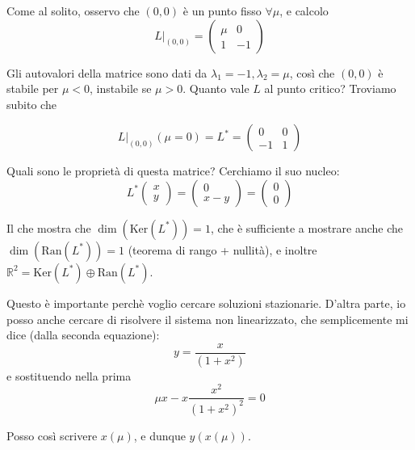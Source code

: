 \documentclass{report}
\begin{document}
Come al solito, osservo che $(0,0)$ è un punto fisso $\forall \mu$, e calcolo 
\begin{equation}
    L|_{(0,0)} = \begin{pmatrix}
        \mu & 0 \\ 1 & -1
    \end{pmatrix}
\end{equation}

Gli autovalori della matrice sono dati da $\lambda_1 = -1, \lambda_2 = \mu$, così che $(0,0)$ è stabile per $\mu<0$, instabile se $\mu>0$. Quanto vale $L$ al punto critico? Troviamo subito che 

\begin{equation}
    L|_{(0,0)}(\mu=0) = L^* = \begin{pmatrix}
        0 &  0 \\ -1 & 1
    \end{pmatrix}
\end{equation}

Quali sono le proprietà di questa matrice? Cerchiamo il suo nucleo: 
\begin{equation}
    L^* \begin{pmatrix}
        x \\ y
    \end{pmatrix} = \begin{pmatrix}
        0 \\ x-y
    \end{pmatrix}
     = \begin{pmatrix}
         0 \\ 0 
     \end{pmatrix}
\end{equation}

Il che mostra che $\dim(\text{Ker}(L^*))=1$, che è sufficiente a mostrare anche che $\dim(\text{Ran}(L^*))=1$ (teorema di rango + nullità), e inoltre $\mathbb{R}^2 = \text{Ker}(L^*) \oplus \text{Ran}(L^*)$.  

Questo è importante perchè voglio cercare soluzioni stazionarie. D'altra parte, io posso anche cercare di risolvere il sistema non linearizzato, che semplicemente mi dice (dalla seconda equazione): 
\begin{equation}
    y = \frac{x}{(1+x^2)}
\end{equation}
e sostituendo nella prima 
\begin{equation}
    \mu x - x\frac{x^2}{(1+x^2)^2} = 0 
\end{equation}

Posso così scrivere $x(\mu)$, e dunque $y(x(\mu))$. \\
\end{document}
